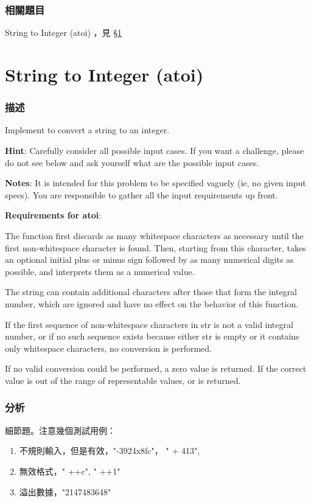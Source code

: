 \subsubsection{相關題目}
\begindot
\item String to Integer (atoi) ，見 \S \ref{sec:string-to-integer}
\myenddot


\section{String to Integer (atoi)} %
\label{sec:string-to-integer}


\subsubsection{描述}
Implement  to convert a string to an integer.

\textbf{Hint}: Carefully consider all possible input cases. If you want a challenge, please do not see below and ask yourself what are the possible input cases.

\textbf{Notes}: It is intended for this problem to be specified vaguely (ie, no given input specs). You are responsible to gather all the input requirements up front.

\textbf{Requirements for atoi}:

The function first discards as many whitespace characters as necessary until the first non-whitespace character is found. Then, starting from this character, takes an optional initial plus or minus sign followed by as many numerical digits as possible, and interprets them as a numerical value.

The string can contain additional characters after those that form the integral number, which are ignored and have no effect on the behavior of this function.

If the first sequence of non-whitespace characters in str is not a valid integral number, or if no such sequence exists because either str is empty or it contains only whitespace characters, no conversion is performed.

If no valid conversion could be performed, a zero value is returned. If the correct value is out of the range of representable values,  or  is returned.

\subsubsection{分析}
細節題。注意幾個測試用例：
\begin{enumerate}
\item 不規則輸入，但是有效，"-3924x8fc"， "  +  413",
\item 無效格式，" ++c", " ++1"
\item 溢出數據，"2147483648"
\end{enumerate}

